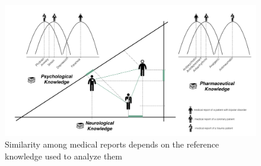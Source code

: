 \begin{figure}[ht]
    \centering
    \includegraphics[width=0.7\linewidth]{context-similarity.png}
    \caption{Similarity among medical reports depends on the reference knowledge used to analyze them}
    \label{fig:context-similarity}
\end{figure}


